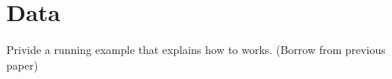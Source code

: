 \documentclass[12pt,letterpaper]{article}
\begin{document}











\section{Data}
Privide a running example that explains how to works. (Borrow from previous paper)
\end{document}
